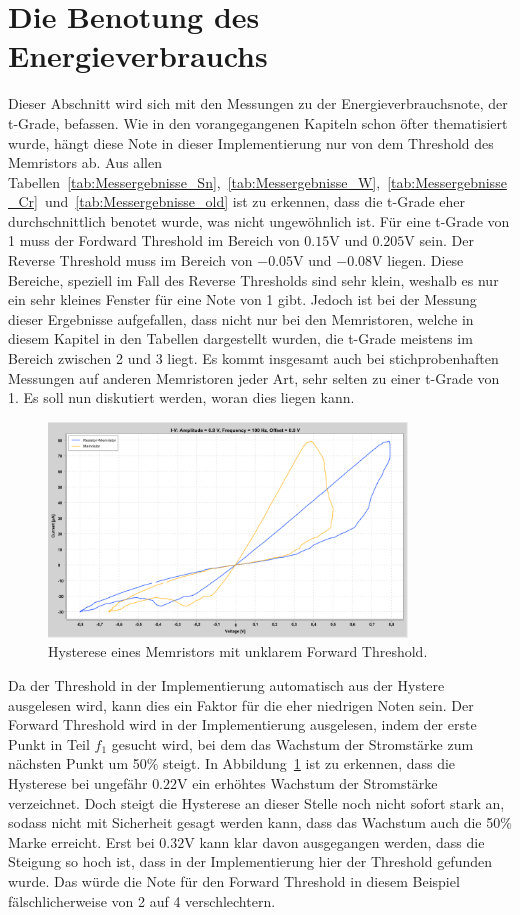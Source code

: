 \section{Die Benotung des Energieverbrauchs}
Dieser Abschnitt wird sich mit den Messungen zu der Energieverbrauchsnote, der \glqq t-Grade\grqq, befassen. Wie in den vorangegangenen Kapiteln schon öfter thematisiert wurde, hängt diese Note in dieser Implementierung nur von dem Threshold des Memristors ab. Aus allen Tabellen~\ref{tab:Messergebnisse_Sn},~\ref{tab:Messergebnisse_W},~\ref{tab:Messergebnisse_Cr}~und~\ref{tab:Messergebnisse_old}
ist zu erkennen, dass die t-Grade eher durchschnittlich benotet wurde, was nicht ungewöhnlich ist. Für eine t-Grade von 1 muss der Fordward Threshold im Bereich von $0.15$V und $0.205$V sein. Der Reverse Threshold muss im Bereich von $-0.05$V und $-0.08$V liegen. Diese Bereiche, speziell im Fall des Reverse Thresholds sind sehr klein, weshalb es nur ein sehr kleines Fenster für eine Note von 1 gibt. Jedoch ist bei der Messung dieser Ergebnisse aufgefallen, dass nicht nur bei den Memristoren, welche in diesem Kapitel in den Tabellen dargestellt wurden, die t-Grade meistens im Bereich zwischen 2 und 3 liegt. Es kommt insgesamt auch bei stichprobenhaften Messungen auf anderen Memristoren jeder Art, sehr selten zu einer t-Grade von 1. Es soll nun diskutiert werden, woran dies liegen kann.

\begin{figure}
  \centering
    \includegraphics[width=0.85\textwidth]{images/Threshold_Hysterese1.png}
  \caption{Hysterese eines Memristors mit unklarem Forward Threshold.}
  \label{fig:Hysteresen_Threshold}
\end{figure}

Da der Threshold in der Implementierung automatisch aus der Hystere ausgelesen wird, kann dies ein Faktor für die eher niedrigen Noten sein. Der Forward Threshold wird in der Implementierung ausgelesen, indem der erste Punkt in Teil $f_1$ gesucht wird, bei dem das Wachstum der Stromstärke zum nächsten Punkt um 50\% steigt. In Abbildung~\ref{fig:Hysteresen_Threshold} ist zu erkennen, dass die Hysterese bei ungefähr $0.22$V ein erhöhtes Wachstum der Stromstärke verzeichnet. Doch steigt die Hysterese an dieser Stelle noch nicht sofort stark an, sodass nicht mit Sicherheit gesagt werden kann, dass das Wachstum auch die 50\% Marke erreicht. Erst bei $0.32$V kann klar davon ausgegangen werden, dass die Steigung so hoch ist, dass in der Implementierung hier der Threshold gefunden wurde. Das würde die Note für den Forward Threshold in diesem Beispiel fälschlicherweise von 2 auf 4 verschlechtern.

